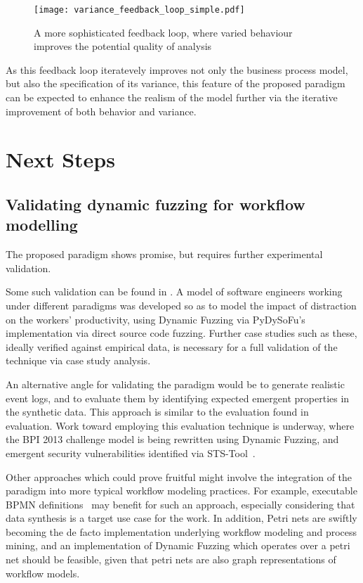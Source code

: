\documentclass[draft,12pt]{llncs}  %
\begin{document}
\begin{figure}[h]
  \centering
  \texttt{[image: variance\_feedback\_loop\_simple.pdf]}
  \caption[Feedback loop with variance]{A more sophisticated feedback loop,
    where varied behaviour improves the potential quality of analysis}
  \label{fig:complex_feedback_loop}
\end{figure}

As this feedback loop iteratevely improves not only the business process model,
but also the specification of its variance, this feature of the proposed
paradigm can be expected to enhance the realism of the model further via the
iterative improvement of both behavior and variance.
\par



\section{Next Steps}
\label{sec:future_work}
\label{sec:conclusion}
\subsection{Validating dynamic fuzzing for workflow modelling}
The proposed paradigm shows promise, but requires further experimental
validation.
\par

Some such validation can be found in \cite{wallis2018modelling}. A model
of software engineers working under different paradigms was developed so as to
model the impact of distraction on the workers' productivity, using Dynamic
Fuzzing via PyDySoFu's implementation via direct source code fuzzing. Further
case studies such as these, ideally verified against empirical data, is
necessary for a full validation of the technique via case study analysis.
\par

An alternative angle for validating the paradigm would be to generate realistic
event logs, and to evaluate them by identifying expected emergent properties in
the synthetic data. This approach is similar to the evaluation found
in~\cite{accorsi2013secsy} evaluation. Work toward employing this evaluation
technique is underway, where the BPI 2013 challenge model is being
rewritten using Dynamic Fuzzing, and emergent security vulnerabilities
identified via STS-Tool~\citep{salnitri2015sts}.
\par

Other approaches which could prove fruitful might involve the integration of the
paradigm into more typical workflow modeling practices. For example, executable
BPMN definitions~\citep{mitsyuk2017generating} may benefit for such an approach,
especially considering that data synthesis is a target use case for the work. In
addition, Petri nets are swiftly becoming the de facto implementation underlying
workflow modeling and process mining\citep{van1998application}, and an
implementation of Dynamic Fuzzing which operates over a petri net should be
feasible, given that petri nets are also graph representations of workflow
models.
\par
\end{document}
